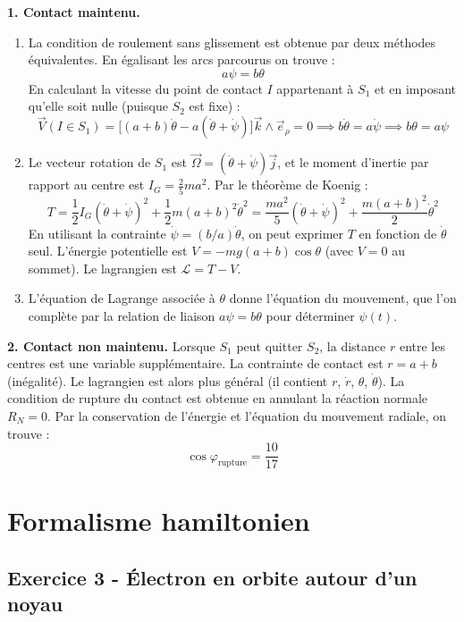 \documentclass[12pt,a4paper]{article}
\begin{document}
\begin{boitecorrige}
\textbf{1. Contact maintenu.}

\begin{enumerate}
  \item[a)] La condition de roulement sans glissement est obtenue par deux méthodes équivalentes. En égalisant les arcs parcourus on trouve :
  \[
    a\psi = b\theta
  \]
  En calculant la vitesse du point de contact $I$ appartenant à $S_1$ et en imposant qu'elle soit nulle (puisque $S_2$ est fixe) :
  \[
    \vec{V}(I \in S_1) = \bigl[(a+b)\dot\theta - a(\dot\theta + \dot\psi)\bigr]\vec{k}\wedge\vec{e}_\rho = 0
    \implies b\dot\theta = a\dot\psi \implies b\theta = a\psi
  \]

  \item[b)] Le vecteur rotation de $S_1$ est $\vec{\Omega} = (\dot\theta + \dot\psi)\vec{j}$, et le moment d'inertie par rapport au centre est $I_G = \frac{2}{5}ma^2$. Par le théorème de Koenig :
  \[
    T = \frac{1}{2}I_G(\dot\theta+\dot\psi)^2 + \frac{1}{2}m(a+b)^2\dot\theta^2
      = \frac{ma^2}{5}(\dot\theta+\dot\psi)^2 + \frac{m(a+b)^2}{2}\dot\theta^2
  \]
  En utilisant la contrainte $\dot\psi = (b/a)\dot\theta$, on peut exprimer $T$ en fonction de $\dot\theta$ seul. L'énergie potentielle est $V = -mg(a+b)\cos\theta$ (avec $V = 0$ au sommet). Le lagrangien est $\mathcal{L} = T - V$.

  \item[c)] L'équation de Lagrange associée à $\theta$ donne l'équation du mouvement, que l'on complète par la relation de liaison $a\psi = b\theta$ pour déterminer $\psi(t)$.
\end{enumerate}

\textbf{2. Contact non maintenu.} Lorsque $S_1$ peut quitter $S_2$, la distance $r$ entre les centres est une variable supplémentaire. La contrainte de contact est $r = a+b$ (inégalité). Le lagrangien est alors plus général (il contient $r$, $\dot{r}$, $\theta$, $\dot\theta$). La condition de rupture du contact est obtenue en annulant la réaction normale $R_N = 0$. Par la conservation de l'énergie et l'équation du mouvement radiale, on trouve :
\[
  \cos\varphi_{\mathrm{rupture}} = \frac{10}{17}
\]
\end{boitecorrige}

\section{Formalisme hamiltonien}

\subsection*{Exercice 3 - Électron en orbite autour d'un noyau \niveau{\difficile}}
\end{document}
